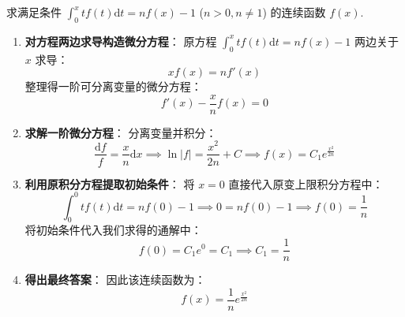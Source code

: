 \documentclass[lang=cn,11pt]{elegantbook}
\begin{document}
\begin{exercise}[变上限积分方程求解]
求满足条件 $\int_0^x tf(t)\mathrm{d}t = nf(x)-1$ ($n>0, n\neq 1$) 的连续函数 $f(x)$.
\end{exercise}
\begin{solution}
\begin{enumerate}
    \item \textbf{对方程两边求导构造微分方程}：
    原方程 $\int_0^x tf(t)\mathrm{d}t = nf(x)-1$ 两边关于 $x$ 求导：
    \[
    x f(x) = n f'(x)
    \]
    整理得一阶可分离变量的微分方程：
    \[
    f'(x) - \frac{x}{n} f(x) = 0
    \]
    
    \item \textbf{求解一阶微分方程}：
    分离变量并积分：
    \[
    \frac{\mathrm{d}f}{f} = \frac{x}{n} \mathrm{d}x \implies \ln|f| = \frac{x^2}{2n} + C \implies f(x) = C_1 e^{\frac{x^2}{2n}}
    \]
    
    \item \textbf{利用原积分方程提取初始条件}：
    将 $x=0$ 直接代入原变上限积分方程中：
    \[
    \int_0^0 tf(t)\mathrm{d}t = nf(0) - 1 \implies 0 = n f(0) - 1 \implies f(0) = \frac{1}{n}
    \]
    将初始条件代入我们求得的通解中：
    \[
    f(0) = C_1 e^0 = C_1 \implies C_1 = \frac{1}{n}
    \]
    
    \item \textbf{得出最终答案}：
    因此该连续函数为：
    \[
    f(x) = \frac{1}{n} e^{\frac{x^2}{2n}}
    \]
\end{enumerate}
\end{solution}
\end{document}
